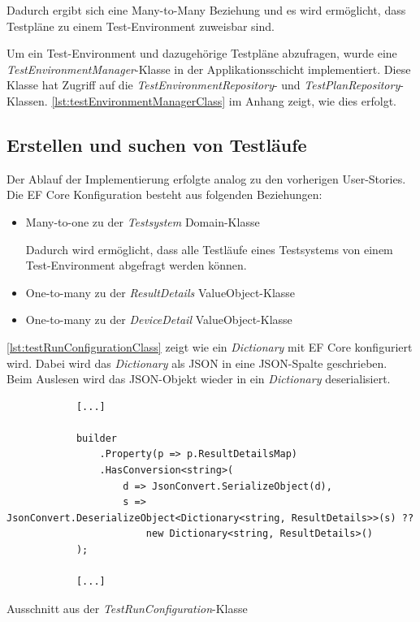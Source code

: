 \documentclass[a4paper, fontsize=11pt, parskip=half, twoside]{scrreprt}
\begin{document}
	Dadurch ergibt sich eine Many-to-Many Beziehung und es wird ermöglicht, dass Testpläne zu einem Test-Environment zuweisbar sind.
	
	Um ein Test-Environment und dazugehörige Testpläne abzufragen, wurde eine \emph{TestEnvironmentManager}-Klasse in der Applikationsschicht implementiert.
	Diese Klasse hat Zugriff auf die \emph{TestEnvironmentRepository}- und \emph{TestPlanRepository}-Klassen.
	\autoref{lst:testEnvironmentManagerClass} im Anhang zeigt, wie dies erfolgt.
	
	\subsection{Erstellen und suchen von Testläufe} \label{subsec:createAndSearchTestruns}
	
	Der Ablauf der Implementierung erfolgte analog zu den vorherigen User-Stories.
	Die \ac{EF} Core Konfiguration besteht aus folgenden Beziehungen:
	
	\begin{itemize}
		\item Many-to-one zu der \emph{Testsystem} Domain-Klasse
		
		Dadurch wird ermöglicht, dass alle Testläufe eines Testsystems von einem Test-Environment abgefragt werden können.
		
		\item One-to-many zu der \emph{ResultDetails} ValueObject-Klasse
		\item One-to-many zu der \emph{DeviceDetail} ValueObject-Klasse
	\end{itemize}
	
	\autoref{lst:testRunConfigurationClass} zeigt wie ein \emph{Dictionary} mit \ac{EF} Core konfiguriert wird.
	Dabei wird das \emph{Dictionary} als \ac{JSON} in eine \ac{JSON}-Spalte geschrieben.
	Beim Auslesen wird das \ac{JSON}-Objekt wieder in ein \emph{Dictionary} deserialisiert.
	
	\begin{listing}[ht]
		\begin{verbatim}
			[...]	
			
			builder
				.Property(p => p.ResultDetailsMap)
				.HasConversion<string>(
					d => JsonConvert.SerializeObject(d),
					s => JsonConvert.DeserializeObject<Dictionary<string, ResultDetails>>(s) ??
						new Dictionary<string, ResultDetails>()
			);		
			
			[...]
		\end{verbatim}
		\caption{Ausschnitt aus der \emph{TestRunConfiguration}-Klasse}
		\label{lst:testRunConfigurationClass}
	\end{listing}
	
\end{document}
